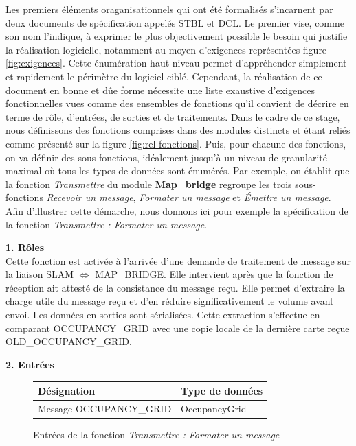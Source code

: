   Les premiers éléments oraganisationnels qui ont été formalisés s'incarnent par deux documents de spécification appelés \gls{STBL} et \gls{DCL}.
  Le premier vise, comme son nom l'indique, à exprimer le plus objectivement possible le besoin qui justifie la réalisation logicielle, notamment au moyen d'exigences représentées figure \ref{fig:exigences}. 
  Cette énumération haut-niveau permet d'appréhender simplement et rapidement le périmètre du logiciel ciblé. 
  Cependant, la réalisation de ce document en bonne et dûe forme nécessite une liste exaustive d'exigences fonctionnelles vues comme des ensembles de fonctions qu'il convient de décrire en terme de rôle, d'entrées, de sorties et
  de traitements. 
  Dans le cadre de ce stage, nous définissons des fonctions comprises dans des modules distincts et étant reliés comme présenté sur la figure \ref{fig:rel-fonctions}.
  Puis, pour chacune des fonctions, on va définir des sous-fonctions, idéalement jusqu'à un niveau de granularité maximal où tous les types de données sont énumérés. 
  Par exemple, on établit que la fonction \emph{Transmettre} du module \textbf{\textcolor{red-stbl}{Map\_bridge}} regroupe les trois sous-fonctions \emph{Recevoir un message}, \emph{Formater un message} et \emph{\'{E}mettre un message}. 
  Afin d'illustrer cette démarche, nous donnons ici pour exemple la spécification de la fonction \emph{Transmettre : Formater un message}. 
  
  \textbf{1. Rôles } \\
  Cette fonction est activée à l’arrivée d’une demande de traitement de message sur la liaison SLAM $\Longleftrightarrow{}$ MAP\_BRIDGE.
  Elle intervient après que la fonction de réception ait attesté de la consistance du message reçu.
  Elle permet d’extraire la charge utile du message reçu et d’en réduire significativement le volume avant envoi.  Les données en sorties sont sérialisées.
  Cette extraction s’effectue en comparant OCCUPANCY\_GRID avec une copie locale de la dernière carte reçue OLD\_OCCUPANCY\_GRID.
  
  \textbf{2. Entrées }
  \begin{figure}[!h]
    \begin{center}
      \begin{tabular}{|l|l|}
	\hline
	\textbf{Désignation} & \textbf{Type de données} \\
	\hline
	Message OCCUPANCY\_GRID & OccupancyGrid \\
	\hline
      \end{tabular}
    \end{center}
    \caption{Entrées de la fonction \emph{Transmettre : Formater un message}}
  \end{figure}
  
